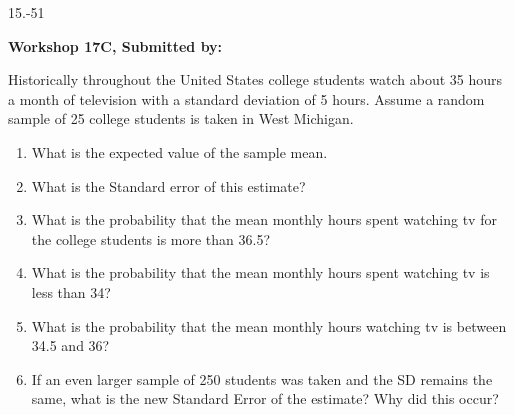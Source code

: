 \begin{exsol@exercise}{15.-51}
    \begin{center}
\begin{flushleft}\textbf{\large \hfill Workshop 17C, Submitted by: }\end{flushleft}

\end{center}

Historically throughout the United States college students watch about 35 hours a month of television with a standard deviation of 5 hours. Assume a random sample of 25 college students is taken in West Michigan.

\begin{enumerate}
  \item What is the expected value of the sample mean.
  \item What is the Standard error of this estimate?
  \item What is the probability that the mean monthly hours spent watching tv for the college students is more than 36.5?
  \item What is the probability that the mean monthly hours spent watching tv is less than 34?
  \item What is the probability that the mean monthly hours watching tv is between 34.5 and 36?
  \item If an even larger sample of 250 students was taken and the SD remains the same, what is the new Standard Error of the estimate? Why did this occur?
\end{enumerate}
\end{exsol@exercise}
